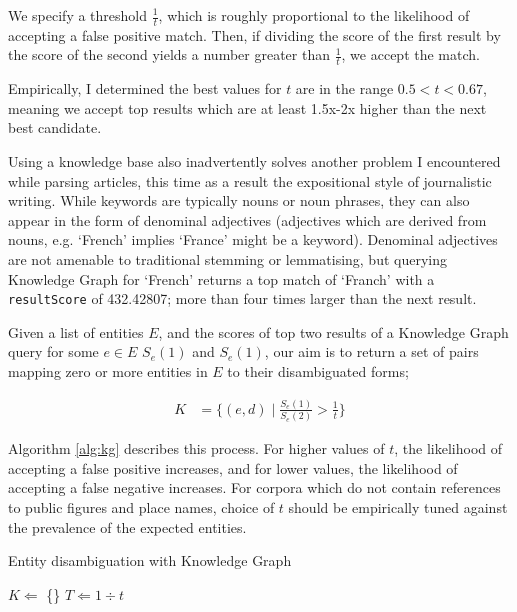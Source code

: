 We specify a threshold $\frac{1}{t}$, which is roughly proportional to the likelihood of accepting a false positive match. Then, if dividing the score of the first result by the score of the second yields a number greater than $\frac{1}{t}$, we accept the match.

Empirically, I determined the best values for $t$ are in the range $0.5 < t < 0.67$, meaning we accept top results which are at least 1.5x-2x higher than the next best candidate.

Using a knowledge base also inadvertently solves another problem I encountered while parsing articles, this time as a result the expositional style of journalistic writing. While keywords are typically nouns or noun phrases, they can also appear in the form of denominal adjectives (adjectives which are derived from nouns, e.g. `French' implies `France' might be a keyword). Denominal adjectives are not amenable to traditional stemming or lemmatising, but querying Knowledge Graph for `French' returns a top match of `Franch' with a \texttt{resultScore} of 432.42807; more than four times larger than the next result.

Given a list of entities $E$, and the scores of top two results of a Knowledge Graph query for some $e \in E$ $S_e(1)$ and $S_e(1)$, our aim is to return a set of pairs mapping zero or more entities in $E$ to their disambiguated forms;

\begin{align*}
K &= \bigg\{(e, d)\;|\;\frac{S_e(1)}{S_e(2)} > \frac{1}{t}\bigg\}
\end{align*}

Algorithm \ref{alg:kg} describes this process. For higher values of $t$, the likelihood of accepting a false positive increases, and for lower values, the likelihood of accepting a false negative increases. For corpora which do not contain references to public figures and place names, choice of $t$ should be empirically tuned against the prevalence of the expected entities.

\begin{algorithm}
\label{alg:kg}
 \caption{Entity disambiguation with Knowledge Graph}
 $K \Leftarrow$ \{\}\;
 $T \Leftarrow 1\div{t}$\;
\end{algorithm}

